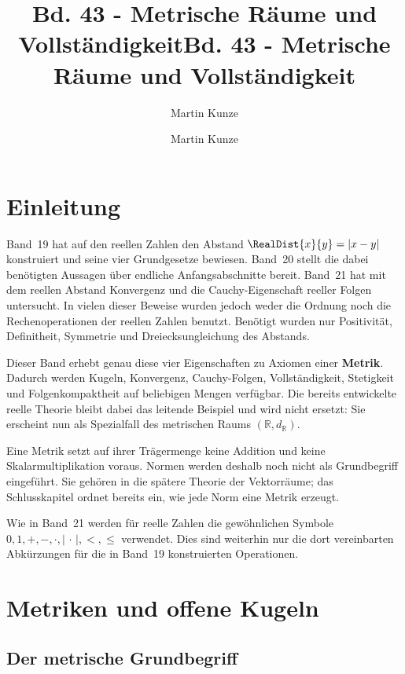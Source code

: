\documentclass[main.tex]{subfiles}
\title{Bd. 43 - Metrische Räume und Vollständigkeit}
\author{Martin Kunze}
\date{}
\begin{document}
\title{Bd. 43 - Metrische Räume und Vollständigkeit}
\author{Martin Kunze}
\date{}
\hypersetup{pageanchor=false}
\maketitle
\hypersetup{pageanchor=true}
\setcounter{tocdepth}{3}
\tableofcontents
\setcounter{file}{43}
\renewcommand{\FormulaBandID}{43}

\chapter{Einleitung}

Band~19 hat auf den reellen Zahlen den Abstand
\(\RealDist{x}{y}=|x-y|\) konstruiert und seine vier Grundgesetze bewiesen.
Band~20 stellt die dabei benötigten Aussagen über endliche Anfangsabschnitte
bereit. Band~21 hat mit dem reellen Abstand Konvergenz und die
Cauchy-Eigenschaft reeller Folgen untersucht. In vielen dieser Beweise wurden
jedoch weder die Ordnung noch die Rechenoperationen der reellen Zahlen
benutzt. Benötigt wurden nur Positivität, Definitheit, Symmetrie und
Dreiecksungleichung des Abstands.

Dieser Band erhebt genau diese vier Eigenschaften zu Axiomen einer
\textbf{Metrik}. Dadurch werden Kugeln, Konvergenz, Cauchy-Folgen,
Vollständigkeit, Stetigkeit und Folgenkompaktheit auf beliebigen Mengen
verfügbar. Die bereits entwickelte reelle Theorie bleibt dabei das leitende
Beispiel und wird nicht ersetzt: Sie erscheint nun als Spezialfall des
metrischen Raums \((\mathbb R,d_{\mathbb R})\).

Eine Metrik setzt auf ihrer Trägermenge keine Addition und keine
Skalarmultiplikation voraus. Normen werden deshalb noch nicht als
Grundbegriff eingeführt. Sie gehören in die spätere Theorie der Vektorräume;
das Schlusskapitel ordnet bereits ein, wie jede Norm eine Metrik erzeugt.

Wie in Band~21 werden für reelle Zahlen die gewöhnlichen Symbole
\(0,1,+,-,\cdot,|\,\cdot\,|,<,\leq\) verwendet. Dies sind weiterhin nur die
dort vereinbarten Abkürzungen für die in Band~19 konstruierten Operationen.

\chapter{Metriken und offene Kugeln}

\section{Der metrische Grundbegriff}
\end{document}
